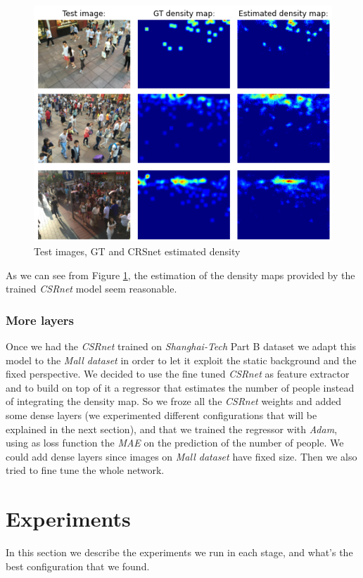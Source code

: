 \documentclass[10pt,twocolumn,letterpaper]{article}
\begin{document}
\begin{figure}[h!]
	\includegraphics[width=\linewidth]{pics/DMpred.png}
	\caption{Test images, GT and CRSnet estimated density}
	\label{fig:DMpred}
\end{figure}

As we can see from Figure \ref{fig:DMpred}, the estimation of the density maps provided by the trained \textit{CSRnet} model seem reasonable.
\subsubsection{More layers}
Once we had the \textit{CSRnet} trained on \textit{Shanghai-Tech} Part B dataset we adapt this model to the \textit{Mall dataset} in order to let it exploit the static background and the fixed perspective. We decided to use the fine tuned \textit{CSRnet} as feature extractor and to build on top of it a regressor that estimates the number of people instead of integrating the density map. So we froze all the \textit{CSRnet} weights and added some dense layers (we experimented different configurations that will be explained in the next section), and that we trained the regressor with \textit{Adam}, using as loss function the \textit{MAE} on the prediction of the number of people. We could add dense layers since images on \textit{Mall dataset} have fixed size. Then we also tried to fine tune the whole network.
\section{Experiments}
In this section we describe the experiments we run in each stage, and what's the best configuration that we found.
\end{document}
